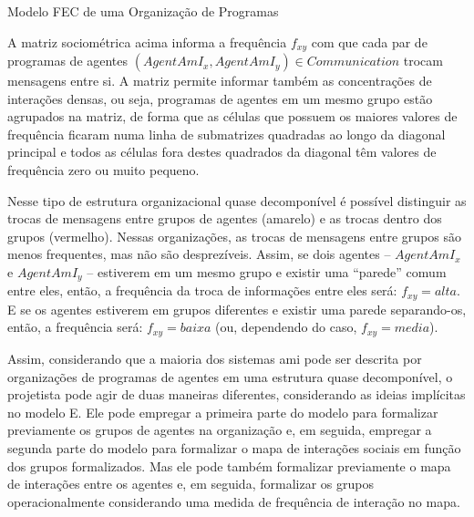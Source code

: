 \begin{section}{Modelo FEC de uma Organização de Programas}
    \begin{figure}[h!]
        \centering
    \end{figure}
    
    A matriz sociométrica acima informa a frequência $f_{xy}$ com que cada par de programas de agentes $(AgentAmI_x, AgentAmI_y) \in Communication$ trocam mensagens entre si. A matriz permite informar também as concentrações de interações densas, ou seja, programas de agentes em um mesmo grupo estão agrupados na matriz, de forma que as células que possuem os maiores valores de frequência ficaram numa linha de submatrizes quadradas ao longo da diagonal principal e todos as células fora destes quadrados da diagonal têm valores de frequência zero ou muito pequeno.    
    
    Nesse tipo de estrutura organizacional quase decomponível é possível distinguir as trocas de mensagens entre grupos de agentes (amarelo) e as trocas dentro dos grupos (vermelho). Nessas organizações, as trocas de mensagens entre grupos são menos frequentes, mas não são desprezíveis. Assim, se dois agentes -- $AgentAmI_x$ e $AgentAmI_y$ -- estiverem em um mesmo grupo e existir uma “parede” comum entre eles, então, a frequência da troca de informações entre eles será: $f_{xy} = alta$. E se os agentes estiverem em grupos diferentes e existir uma parede separando-os, então, a frequência será: $f_{xy} = baixa$ (ou, dependendo do caso, $f_{xy} = media$).
    
    Assim, considerando que a maioria dos sistemas \acrshort{ami} pode ser descrita por organizações de programas de agentes em uma estrutura quase decomponível, o projetista pode agir de duas maneiras diferentes, considerando as ideias implícitas no modelo E. Ele pode empregar a primeira parte do modelo para formalizar previamente os grupos de agentes na organização e, em seguida, empregar a segunda parte do modelo para formalizar o mapa de interações sociais em função dos grupos formalizados. Mas ele pode também formalizar previamente o mapa de interações entre os agentes e, em seguida, formalizar os grupos operacionalmente considerando uma medida de frequência de interação no mapa. 
    

\end{section}
